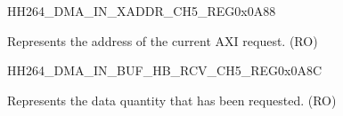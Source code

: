 \begin{register}{H}{H264\_DMA\_IN\_XADDR\_CH5\_REG}{0x0A88}\label{regdesc:H264DMAINXADDRCH5REG}
%
\regnewline%
\begin{regdesc}\begin{reglist}
\label{fielddesc:H264DMAINCMDFIFOXADDRCH5}\item [H264\_DMA\_IN\_CMDFIFO\_XADDR\_CH5] Represents the address of the current AXI request. (RO)
\end{reglist}\end{regdesc}
\end{register}


\begin{register}{H}{H264\_DMA\_IN\_BUF\_HB\_RCV\_CH5\_REG}{0x0A8C}\label{regdesc:H264DMAINBUFHBRCVCH5REG}
%
%
\regnewline%
\begin{regdesc}\begin{reglist}
\label{fielddesc:H264DMAINCMDFIFOBUFHBRCVCH5}\item [H264\_DMA\_IN\_CMDFIFO\_BUF\_HB\_RCV\_CH5] Represents the data quantity that has been requested. (RO)
\end{reglist}\end{regdesc}
\end{register}




